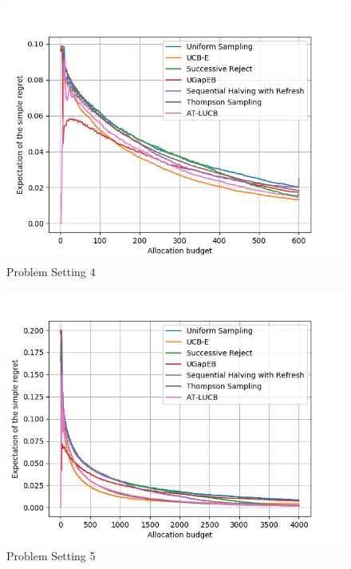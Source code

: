 \documentclass[runningheads,a4paper]{llncs}
\begin{document}
\begin{figure}[ht]
    	\centering\includegraphics[width=\textwidth]{../results/ts_mpa/setting4.png}
    	\caption{Problem Setting 4}
	\label{ts_mpa_4}
\end{figure}
\begin{figure}[ht]
	\centering\includegraphics[width=\textwidth]{../results/ts_mpa/setting5.png}
    	\caption{Problem Setting 5}
	\label{ts_mpa_5}
\end{figure}
\end{document}
